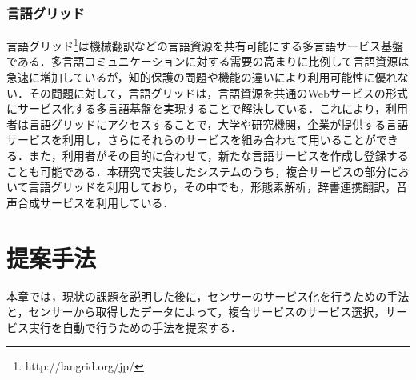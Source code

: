 \documentclass{kuisthesis}			%
\begin{document}
\subsubsection{言語グリッド}
言語グリッド\footnote{http://langrid.org/jp/}\cite{Langrid}は機械翻訳などの言語資源を共有可能にする多言語サービス基盤である．多言語コミュニケーションに対する需要の高まりに比例して言語資源は急速に増加しているが，知的保護の問題や機能の違いにより利用可能性に優れない．その問題に対して，言語グリッドは，言語資源を共通のWebサービスの形式にサービス化する多言語基盤を実現することで解決している．\cite{Ishida2012a}これにより，利用者は言語グリッドにアクセスすることで，大学や研究機関，企業が提供する言語サービスを利用し，さらにそれらのサービスを組み合わせて用いることができる．また，利用者がその目的に合わせて，新たな言語サービスを作成し登録することも可能である．本研究で実装したシステムのうち，複合サービスの部分において言語グリッドを利用しており，その中でも，形態素解析，辞書連携翻訳，音声合成サービスを利用している．

\section{提案手法}
本章では，現状の課題を説明した後に，センサーのサービス化を行うための手法と，センサーから取得したデータによって，複合サービスのサービス選択，サービス実行を自動で行うための手法を提案する．
\end{document}
